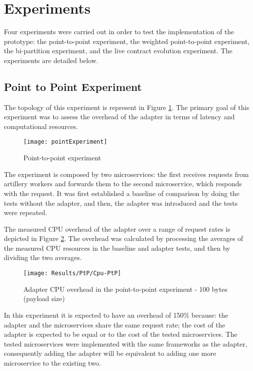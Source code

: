\section{Experiments} %
\label{sec:experiments}

Four experiments were carried out in order to test the implementation of the prototype:
the point-to-point experiment, the weighted point-to-point experiment, the bi-partition experiment, and the live contract evolution experiment.
The experiments are detailed below.

\subsection{Point to Point Experiment}

The topology of this experiment is represent in Figure \ref{fig:point}.
The primary goal of this experiment was to assess the overhead of the adapter in terms of latency and computational resources.

\begin{figure}[htbp]
    \centering
    \centerline{\texttt{[image: pointExperiment]}}
    \caption{Point-to-point experiment}
    \label{fig:point}
\end{figure}

The experiment is composed by two microservices:
the first receives requests from artillery workers and forwards them to the second microservice, which responds with the request.
It was first established a baseline of comparison
by doing the tests without the adapter, and then, the adapter was introduced and the tests were repeated.

The measured CPU overhead of the adapter over a
range of request rates is depicted in Figure \ref{fig:cpuPtp}.
The overhead was calculated by processing the averages of the measured CPU resources in the baseline and adapter tests, and then by dividing the two averages.

\begin{figure}[htbp]
    \centering
    \centerline{\texttt{[image: Results/PtP/Cpu-PtP]}}
    \caption{Adapter CPU overhead in the point-to-point experiment - 100 bytes (payload size)}
    \label{fig:cpuPtp}
\end{figure}

In this experiment it is expected to have an overhead of 150\% because: the adapter and the microservices share the same request rate;
the cost of the adapter is expected to be equal or to the cost of the tested microservices.
The tested microservices were implemented with the same frameworks as the adapter, consequently adding the adapter will be equivalent to adding one more microservice to the existing two.


